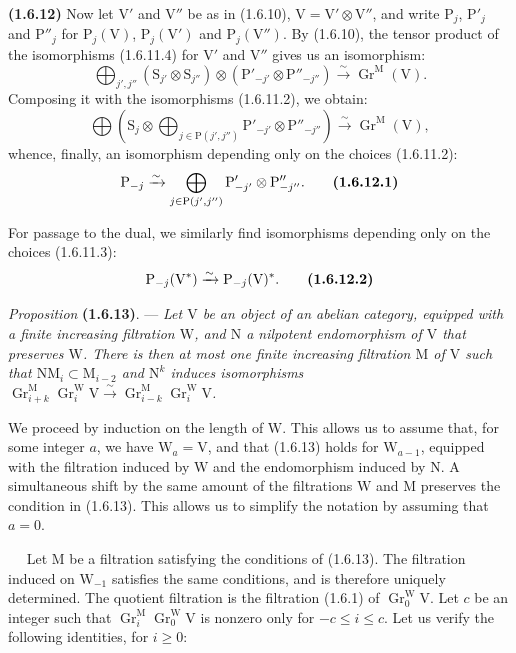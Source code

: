\documentclass[11pt,leqno]{article}
\newcommand{\Page}[1]{\ifvmode\noindent\else\unskip\ \fi{\footnotesize\textcolor{gray}{[p.\,#1]}}\ \ignorespaces}
\begin{document}
\textbf{(1.6.12)} Now let \(\mathrm{V}'\) and \(\mathrm{V}''\) be as in (1.6.10), \(\mathrm{V}=\mathrm{V}'\otimes\mathrm{V}''\), and write \(\mathrm{P}_j\), \(\mathrm{P}'_j\) and \(\mathrm{P}''_j\) for \(\mathrm{P}_j(\mathrm{V})\), \(\mathrm{P}_j(\mathrm{V}')\) and \(\mathrm{P}_j(\mathrm{V}'')\). By (1.6.10), the tensor product of the isomorphisms (1.6.11.4) for \(\mathrm{V}'\) and \(\mathrm{V}''\) gives us an isomorphism:
\[
\bigoplus_{j',j''}
(\mathrm{S}_{j'}\otimes\mathrm{S}_{j''})
\otimes(\mathrm{P}'_{-j'}\otimes\mathrm{P}''_{-j''})
\xrightarrow{\sim}\operatorname{Gr}^{\mathrm{M}}(\mathrm{V}).
\]
Composing it with the isomorphisms (1.6.11.2), we obtain:
\[
\bigoplus
\left(\mathrm{S}_j\otimes
\bigoplus_{j\in\mathrm{P}(j',j'')}
\mathrm{P}'_{-j'}\otimes\mathrm{P}''_{-j''}\right)
\xrightarrow{\sim}\operatorname{Gr}^{\mathrm{M}}(\mathrm{V}),
\]
whence, finally, an isomorphism depending only on the choices (1.6.11.2):
\[
\mathrm{P}_{-j}\xrightarrow{\sim}
\bigoplus_{j\in\mathrm{P}(j',j'')}
\mathrm{P}'_{-j'}\otimes\mathrm{P}''_{-j''}.
\tag*{\textbf{(1.6.12.1)}}
\]

For passage to the dual, we similarly find isomorphisms depending only on the choices (1.6.11.3):
\[
\mathrm{P}_{-j}(\mathrm{V}^*)\xrightarrow{\sim}\mathrm{P}_{-j}(\mathrm{V})^*.
\tag*{\textbf{(1.6.12.2)}}
\]

\textit{Proposition} \textbf{(1.6.13)}. — \textit{Let \(\mathrm{V}\) be an object of an abelian category, equipped with a finite increasing filtration \(\mathrm{W}\), and \(\mathrm{N}\) a nilpotent endomorphism of \(\mathrm{V}\) that preserves \(\mathrm{W}\). There is then at most one finite increasing filtration \(\mathrm{M}\) of \(\mathrm{V}\) such that \(\mathrm{N}\mathrm{M}_i\subset\mathrm{M}_{i-2}\) and \(\mathrm{N}^k\) induces isomorphisms \(\operatorname{Gr}_{i+k}^{\mathrm{M}}\operatorname{Gr}_i^{\mathrm{W}}\mathrm{V}\xrightarrow{\sim}\operatorname{Gr}_{i-k}^{\mathrm{M}}\operatorname{Gr}_i^{\mathrm{W}}\mathrm{V}\).}

We proceed by induction on the length of \(\mathrm{W}\). This allows us to assume that, for some integer \(a\), we have \(\mathrm{W}_a=\mathrm{V}\), and that (1.6.13) holds for \(\mathrm{W}_{a-1}\), equipped with the filtration induced by \(\mathrm{W}\) and the endomorphism induced by \(\mathrm{N}\). A simultaneous shift by the same amount of the filtrations \(\mathrm{W}\) and \(\mathrm{M}\) preserves the condition in (1.6.13). This allows us to simplify the notation by assuming that \(a=0\).

\Page{169}
Let \(\mathrm{M}\) be a filtration satisfying the conditions of (1.6.13). The filtration induced on \(\mathrm{W}_{-1}\) satisfies the same conditions, and is therefore uniquely determined. The quotient filtration is the filtration (1.6.1) of \(\operatorname{Gr}_0^{\mathrm{W}}\mathrm{V}\). Let \(c\) be an integer such that \(\operatorname{Gr}_i^{\mathrm{M}}\operatorname{Gr}_0^{\mathrm{W}}\mathrm{V}\) is nonzero only for \(-c\leq i\leq c\). Let us verify the following identities, for \(i\geq0\):
\end{document}
